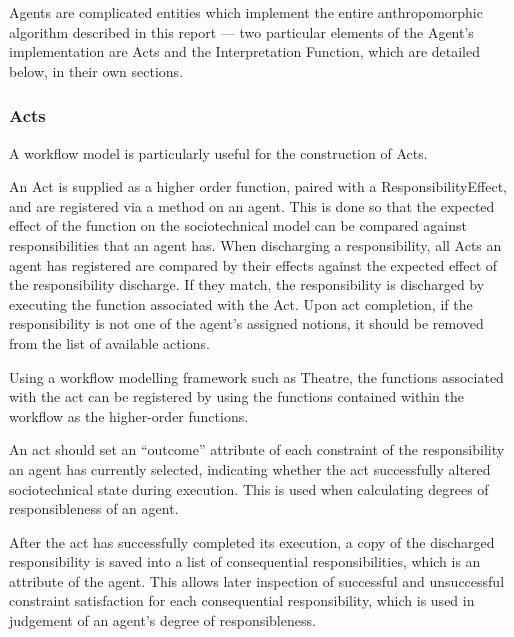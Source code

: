 Agents are complicated entities which implement the entire anthropomorphic algorithm described in this report --- two particular elements of the Agent's implementation are Acts and the Interpretation Function, which are detailed below, in their own sections.

\subsubsection{Acts}
A workflow model is particularly useful for the construction of Acts.\par

An Act is supplied as a higher order function, paired with a ResponsibilityEffect, and are registered via a method on an agent. This is done so that the expected effect of the function on the sociotechnical model can be compared against responsibilities that an agent has. When discharging a responsibility, all Acts an agent has registered are compared by their effects against the expected effect of the responsibility discharge. If they match, the responsibility is discharged by executing the function associated with the Act. Upon act completion, if the responsibility is not one of the agent's assigned notions, it should be removed from the list of available actions.\par

Using a workflow modelling framework such as Theatre\cite{theatre_code}, the functions associated with the act can be registered by using the functions contained within the workflow as the higher-order functions.\par

An act should set an ``outcome'' attribute of each constraint of the responsibility an agent has currently selected, indicating whether the act successfully altered sociotechnical state during execution. This is used when calculating degrees of responsibleness of an agent.\par

After the act has successfully completed its execution, a copy of the discharged responsibility is saved into a list of consequential responsibilities, which is an attribute of the agent. This allows later inspection of successful and unsuccessful constraint satisfaction for each consequential responsibility, which is used in judgement of an agent's degree of responsibleness.\par


